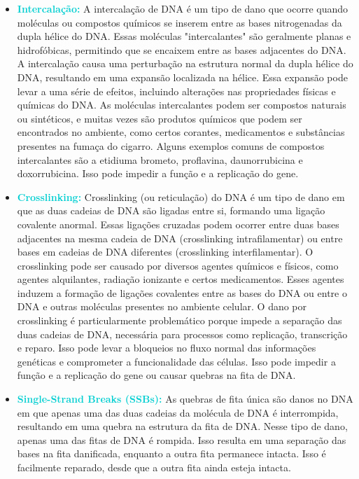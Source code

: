 \documentclass[11pt,a4paper]{article}
\newcounter{exemplo}
\begin{document}
\begin{itemize}[label=\textcolor{CarnationPink}{$\blacktriangleright$}]
    \item \textcolor{DarkTurquoise}{\textbf{Intercalação:}} A intercalação de DNA é um tipo de dano que ocorre quando moléculas ou compostos químicos se inserem entre as bases nitrogenadas da dupla hélice do DNA. Essas moléculas "intercalantes" são geralmente planas e hidrofóbicas, permitindo que se encaixem entre as bases adjacentes do DNA. A intercalação causa uma perturbação na estrutura normal da dupla hélice do DNA, resultando em uma expansão localizada na hélice. Essa expansão pode levar a uma série de efeitos, incluindo alterações nas propriedades físicas e químicas do DNA. As moléculas intercalantes podem ser compostos naturais ou sintéticos, e muitas vezes são produtos químicos que podem ser encontrados no ambiente, como certos corantes, medicamentos e substâncias presentes na fumaça do cigarro. Alguns exemplos comuns de compostos intercalantes são a etidiuma brometo, proflavina, daunorrubicina e doxorrubicina. Isso pode impedir a função e a replicação do gene.
    
    \item \textcolor{DarkTurquoise}{\textbf{Crosslinking:}} Crosslinking (ou reticulação) do DNA é um tipo de dano em que as duas cadeias de DNA são ligadas entre si, formando uma ligação covalente anormal. Essas ligações cruzadas podem ocorrer entre duas bases adjacentes na mesma cadeia de DNA (crosslinking intrafilamentar) ou entre bases em cadeias de DNA diferentes (crosslinking interfilamentar). O crosslinking pode ser causado por diversos agentes químicos e físicos, como agentes alquilantes, radiação ionizante e certos medicamentos. Esses agentes induzem a formação de ligações covalentes entre as bases do DNA ou entre o DNA e outras moléculas presentes no ambiente celular. O dano por crosslinking é particularmente problemático porque impede a separação das duas cadeias de DNA, necessária para processos como replicação, transcrição e reparo. Isso pode levar a bloqueios no fluxo normal das informações genéticas e comprometer a funcionalidade das células. Isso pode impedir a função e a replicação do gene ou causar quebras na fita de DNA.
    
    \item \textcolor{DarkTurquoise}{\textbf{Single-Strand Breaks (SSBs):}} As quebras de fita única são danos no DNA em que apenas uma das duas cadeias da molécula de DNA é interrompida, resultando em uma quebra na estrutura da fita de DNA. Nesse tipo de dano, apenas uma das fitas de DNA é rompida. Isso resulta em uma separação das bases na fita danificada, enquanto a outra fita permanece intacta. Isso é facilmente reparado, desde que a outra fita ainda esteja intacta.
    

\end{itemize}
\end{document}
